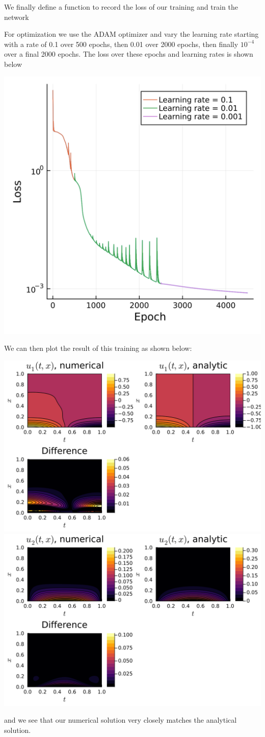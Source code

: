 \documentclass{CUP-JNL-DTM}%
\theoremstyle{definition}
\numberwithin{equation}{section}
\begin{document}
We finally define a function to record the loss of our training and train the network

For optimization we use the ADAM optimizer and vary the learning rate starting with a rate of 0.1 over 500 epochs, then 0.01 over 2000 epochs, then finally $10^{-4}$ over a final 2000 epochs. The loss over these epochs and learning rates is shown below

\begin{center}
    \includegraphics[width=0.3\linewidth]{figures/integral_PDE_plots/loss.png}
\end{center}

We can then plot the result of this training as shown below:

\begin{center}
    \includegraphics[width=0.48\linewidth]{figures/integral_PDE_plots/plot_u1.png}
    \includegraphics[width=0.48\linewidth]{figures/integral_PDE_plots/plot_u2.png}
\end{center}
and we see that our numerical solution very closely matches the analytical solution. 
\end{document}

